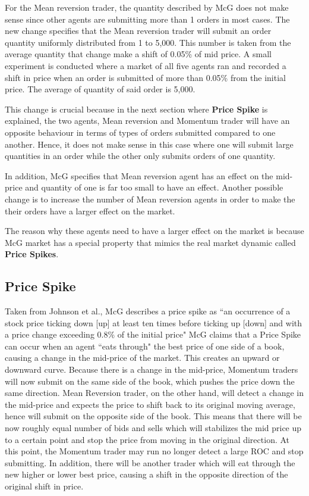 For the Mean reversion trader, the quantity described by McG does not make sense since other agents are submitting more than 1 orders in most cases. The new change specifies that the Mean reversion trader will submit an order quantity uniformly distributed from 1 to 5,000. This number is taken from the average quantity that change make a shift of 0.05\% of mid price. A small experiment is conducted where a market of all five agents ran and recorded a shift in price when an order is submitted of more than 0.05\% from the initial price. The average of quantity of said order is 5,000. 

This change is crucial because in the next section where \textbf{Price Spike} is explained, the two agents, Mean reversion and Momentum trader will have an opposite behaviour in terms of types of orders submitted compared to one another. Hence, it does not make sense in this case where one will submit large quantities in an order while the other only submits orders of one quantity. 

In addition, McG specifies that Mean reversion agent has an effect on the mid-price and quantity of one is far too small to have an effect. Another possible change is to increase the number of Mean reversion agents in order to make the their orders have a larger effect on the market. 

The reason why these agents need to have a larger effect on the market is because McG market has a special property that mimics the real market dynamic called \textbf{Price Spikes}.

\subsection{Price Spike}

Taken from Johnson et al., McG describes a price spike as ``an occurrence of a stock price ticking down [up] at least ten times before ticking up [down] and with a price change exceeding 0.8\% of the initial price" \cite{McGroarty} McG claims that a Price Spike can occur when an agent ``eats through" the best price of one side of a book, causing a change in the mid-price of the market. This creates an upward or downward curve. Because there is a change in the mid-price, Momentum traders will now submit on the same side of the book, which pushes the price down the same direction. Mean Reversion trader, on the other hand, will detect a change in the mid-price and expects the price to shift back to its original moving average, hence will submit on the opposite side of the book. This means that there will be now roughly equal number of bids and sells which will stabilizes the mid price up to a certain point and stop the price from moving in the original direction. At this point, the Momentum trader may run no longer detect a large ROC and stop submitting. In addition, there will be another trader which will eat through the new higher or lower best price, causing a shift in the opposite direction of the original shift in price. 

